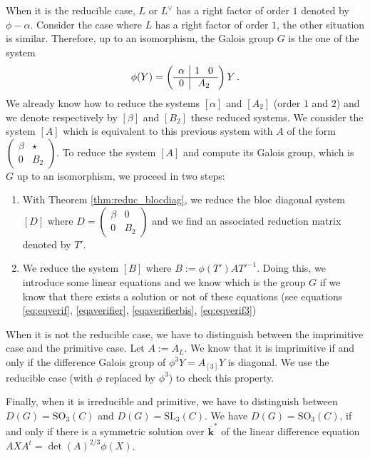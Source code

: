 \documentclass[a4paper,11pt]{amsart}
\begin{document}
When it is the reducible case, $L$ or  $L^{\vee}$ has a right factor of order $1$ denoted by $\phi-\alpha$. Consider the case where $L$  has a right factor of order $1$, the other situation is similar. Therefore, up to an isomorphism, the Galois group $G$ is the one of the system 
$$\phi (Y)= \left(\begin{array}{c|c}
\alpha &  1 \hspace*{0.3cm} 0  \\
\hline
0 &  A_2 
\end{array}\right)Y \, . $$
We already know how to reduce the systems $[\alpha]$ and $[A_2]$ (order $1$ and $2$) and we denote respectively by $[\beta]$ and $[B_2]$ these reduced systems. We consider the system $[A]$ which is equivalent to this previous system with $A$ of the form  
$\begin{pmatrix}
\beta &\star \\ 
0 & B_2
\end{pmatrix}$. To reduce the system $[A]$ and compute its Galois group, which is $G$ up to an isomorphism, we proceed in two steps:
\begin{enumerate}
    \item With Theorem \ref{thm:reduc_blocdiag}, we reduce the bloc diagonal system $[D]$ where $D = \begin{pmatrix}
\beta &0 \\ 
0 & B_2
\end{pmatrix}$ and we find an associated reduction  matrix denoted by $T'$.
\item We reduce the system $[B]$ where $B:=\phi(T')A T'^{-1}$. Doing this, we introduce some linear equations and we know which is the group $G$ if we know that there exists a solution or not of these equations (see equations \eqref{eq:eqverif}, \eqref{eqaverifier}, \eqref{eqaverifierbis}, \eqref{eq:eqverif3}) 
\end{enumerate}

\medskip

When it is not the reducible case, we have to distinguish between the imprimitive case and the primitive case. Let $A:=A_L$. We know that it is imprimitive if and only if the difference Galois group of $\phi^3 Y=A_{[3]}Y$ is diagonal. We use the reducible case (with $\phi$ replaced by $\phi^3$) to check this property.  

\medskip

Finally,  when it is irreducible and primitive, we have to distinguish between $D(G)=\mathrm{SO}_3 (C)$ and  $D(G)=\mathrm{SL}_3 (C)$. We have $D(G)=\mathrm{SO}_3 (C)$, if and only if there is a symmetric solution over $\overline{\mathbf{k}}^*$ of the linear difference equation $A XA^t =\det(A)^{2/3}\phi(X)$.  
\end{document}
